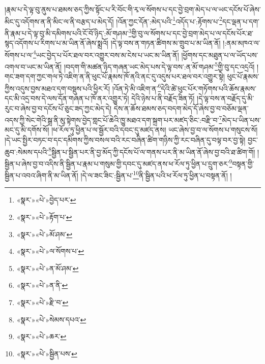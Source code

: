 །རྣམ་པ་དེ་ལྟ་བུ་ནུས་པ་ཐམས་ཅད་ཀྱིས་སྟོང་པ་རི་བོང་གི་རྭ་ལ་སོགས་པ་དང་བྱེ་བྲག་མེད་པ་ལ་ཡང་དངོས་པོ་ཞེས་མིང་དུ་འདོགས་ན་ནི་མིང་ལ་ནི་བརྩད་པ་མེད་དོ། །འོན་ཀྱང་དོན་:མེད་པའི་\footnote{«སྣར་»«པེ་»བྱེད་པར་}འདོད་པ་:རྟོགས་པ་\footnote{«སྣར་»«པེ་»རྟོག་པ་}དང་ལྡན་པ་དག་ནི་རྣམ་པ་དེ་ལྟ་བུ་མི་དམིགས་པའི་ངོ་བོ་ཉིད་:མོ་གཤམ་\footnote{«སྣར་»«པེ་»མོ་ཤམ་}གྱི་བུ་ལ་སོགས་པ་དང་བྱེ་བྲག་མེད་པ་ལ་དངོས་པོར་ཐ་སྙད་འདོགས་པ་རིགས་པ་མ་ཡིན་ནོ་ཞེས་སྨྲའོ། །དེ་ལྟ་བས་ན་གཏན་ཚིགས་མ་གྲུབ་པ་མ་ཡིན་ནོ། །:ནམ་མཁའ་ལ་སོགས་པ་ལ་\footnote{«སྣར་»«པེ་»ལ་སོགས་པ་}ཡང་བྱེད་པ་པོར་ཐལ་བར་འགྱུར་བས་མ་ངེས་པ་ཡང་མ་ཡིན་ནོ། །ཕྱོགས་དང་མཐུན་པ་ལ་ཡོད་པས་འགལ་བ་ཡང་མ་ཡིན་ནོ། །བདག་གི་མཚན་ཉིད་གཞན་ཡང་མེད་པས་དེ་ལྟ་བས་:ན་མོ་གཤམ་\footnote{«སྣར་»«པེ་»ན་མོ་ཤམ་}གྱི་བུ་དང་འདྲའོ། །གང་ཟག་དག་ཀྱང་གལ་ཏེ་འཇིག་ན་ནི་ཕུང་པོ་རྣམས་ཁོ་ནའི་ནང་དུ་འདུས་པར་ཐལ་བར་འགྱུར་སྟེ། ཕུང་པོ་རྣམས་ཀྱིས་འདུས་བྱས་མཐའ་དག་བསྡུས་པའི་ཕྱིར་རོ། །འོན་ཏེ་མི་འཇིག་ན་\footnote{«སྣར་»«པེ་»ན་ནི་}དེའི་ཚེ་ཕུང་པོར་གཏོགས་པའི་ཆོས་རྣམས་དང་མི་འདྲ་བས་དེ་ལས་དོན་གཞན་པ་ཁོ་ནར་འགྱུར་ཏེ། དེའི་ཉེས་པ་ནི་བརྗོད་ཟིན་ཏོ། །དེ་ལྟ་བས་ན་བརྗོད་དུ་མི་རུང་བ་ཞེས་བྱ་བ་དངོས་པོ་ཅུང་ཟད་ཀྱང་མེད་དེ། དེས་ན་ཆོས་ཐམས་ཅད་བདག་མེད་དོ་ཞེས་བྱ་བ་བཅོམ་ལྡན་འདས་ཀྱི་སེང་གེའི་སྒྲ་ནི་མུ་སྟེགས་བྱེད་གླང་པོ་ཆེའི་ཁྱུ་མཐའ་དག་སྐྲག་པར་མཛད་ཅིང་:བརྫི་བ་\footnote{«སྣར་»«པེ་»རྫི་བ་}མེད་པ་ཡིན་པས་མང་དུ་མི་དགོས་སོ། །ཕ་རོལ་ཏུ་ཕྱིན་པ་ལ་སྦྱོར་བའི་དབང་དུ་མཛད་ནས། ཡང་ཞེས་བྱ་བ་ལ་སོགས་པ་གསུངས་སོ། །དེ་ཡང་སྤྱིར་བཏང་བ་དང་དམིགས་ཀྱིས་བསལ་བའི་རང་བཞིན་ཚིག་གཉིས་ཀྱི་རང་བཞིན་དུ་བལྟ་བར་བྱ་སྟེ། བྱང་ཆུབ་:སེམས་དཔའི་\footnote{«སྣར་»«པེ་»སེམས་དཔའ་}སྦྱིན་པ་སྦྱིན་པར་ནི་བྱ་མོད་ཀྱི་དངོས་པོ་ལ་གནས་པར་ནི་མ་ཡིན་ནོ་ཞེས་བྱ་བའི་ཐ་ཚིག་གོ། །སྦྱིན་པ་ཞེས་བྱ་བ་འདིས་ནི་སྦྱིན་པ་རྣམ་པ་གསུམ་གྱི་དབང་དུ་མཛད་ནས་ཕ་རོལ་ཏུ་ཕྱིན་པ་དྲུག་ཅར་\footnote{«སྣར་»«པེ་»ཆར་}བསྟན་གྱི་སྦྱིན་པ་འབའ་ཞིག་ནི་མ་ཡིན་ནོ། །དེ་ལ་ཟང་ཟིང་:སྦྱིན་པ་\footnote{«སྣར་»«པེ་»སྦྱིན་པས་}ནི་སྦྱིན་པའི་ཕ་རོལ་ཏུ་ཕྱིན་པ་བསྟན་ནོ། །
